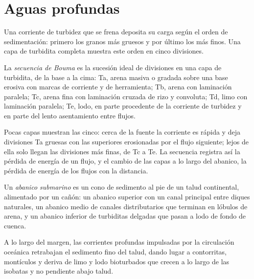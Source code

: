 \section{Aguas profundas}\label{sec:b3:facies-models:deep}

Una corriente de turbidez que se frena deposita su carga según el orden de sedimentación:
primero los granos más gruesos y por último los más finos. Una capa de turbidita completa muestra
este orden en cinco divisiones.

\begin{definition}\label{def:b3:facies-models:bouma}
La \emph{secuencia de Bouma} es la sucesión ideal de
divisiones en una capa de turbidita, de la base a la cima: Ta, arena masiva o gradada sobre
una base erosiva con marcas de corriente y de herramienta; Tb, arena con laminación paralela; Tc,
arena fina con laminación cruzada de rizo y convoluta; Td, limo con laminación paralela;
Te, lodo, en parte procedente de la corriente de turbidez y en parte del lento asentamiento
entre flujos.
\end{definition}

Pocas capas muestran las cinco: cerca de la fuente la corriente es rápida y deja divisiones Ta gruesas
con las superiores erosionadas por el flujo siguiente; lejos de ella solo
llegan las divisiones más finas, de Tc a Te. La secuencia registra así la
pérdida de energía de un flujo, y el cambio de las capas a lo largo del abanico, la pérdida de energía de los flujos
con la distancia.

\begin{definition}\label{def:b3:facies-models:fan}
Un \emph{abanico submarino} es un cono de sedimento al pie
de un talud continental, alimentado por un cañón: un abanico superior con un canal principal
entre diques naturales, un abanico medio de canales distributarios que terminan en lóbulos de arena,
y un abanico inferior de turbiditas delgadas que pasan a lodo de fondo de cuenca.
\end{definition}

A lo largo del margen, las corrientes profundas impulsadas por la circulación oceánica retrabajan el
sedimento fino del talud, dando lugar a contorritas, montículos y deriva de
limo y lodo bioturbados que crecen a lo largo de las isobatas y no pendiente abajo
talud.

